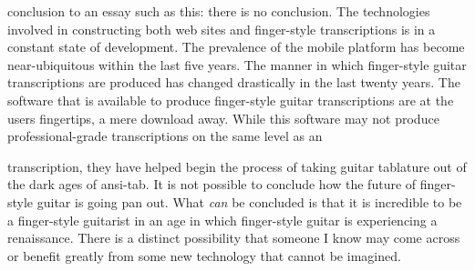\documentclass[nofonts,nobib]{tufte-handout}
\newcommand{\textls}[2][5]{%
    \begingroup\addfontfeatures{LetterSpace=#1}#2\endgroup
  }
\renewcommand{\smallcapsspacing}[1]{\textls[10]{#1}}
\renewcommand{\textsc}[1]{\smallcapsspacing{\textsmallcaps{#1}}}
\begin{document}
 conclusion to an essay such as
this: there is no conclusion. The technologies involved in
constructing both web sites and finger-style transcriptions is in a
constant state of development. The prevalence of the mobile platform
has become near-ubiquitous within the last five years. The manner in
which finger-style guitar transcriptions are produced has changed
drastically in the last twenty years. The software that is available
to produce finger-style guitar transcriptions are at the users
fingertips, a mere download away. While this software may not produce
professional-grade transcriptions on the same level as an \textsc{sel}
transcription, they have helped begin the process of taking guitar
tablature out of the dark ages of ansi-tab. It is not possible to
conclude how the future of finger-style guitar is going pan out. What
\emph{can} be concluded is that it is incredible to be a finger-style
guitarist in an age in which finger-style guitar is experiencing a
renaissance. There is a distinct possibility that someone I know may
come across or benefit greatly from some new technology that cannot be
imagined.

\nocite{alexAnderson,alexDeGrassi,andrewWhite,andyMcKee,billyMcLaughlin,adamRafferty,calumGraham,cliveCarroll,craigDAndrea,evaAtmatzidou,ewanDobson,garethPearson,happyTraum,ianEthanCase,janetFeder,jimmyWahlsteen,jonGomm,kakiKing,kellyValleau,kevinHorrigan,leoKottke,lucaStricagnoli,lucasMich,masaakiKishibe,michaelChap,michaelGul,mikeDawes,murielAnders,peppino,peterCiluzzi,peterFinger,pierre,rayMontford,pino,spencerElliot,sunghaJung,thomasLeeb,timSparks,tommyEmmanuel,trevorGH,vickiGenfan}
% 
% 
\printbibliography
\end{document}
